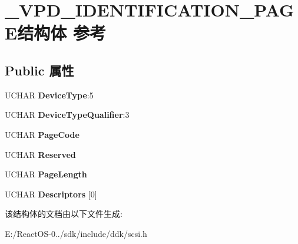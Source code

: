 \hypertarget{struct___v_p_d___i_d_e_n_t_i_f_i_c_a_t_i_o_n___p_a_g_e}{}\section{\+\_\+\+V\+P\+D\+\_\+\+I\+D\+E\+N\+T\+I\+F\+I\+C\+A\+T\+I\+O\+N\+\_\+\+P\+A\+G\+E结构体 参考}
\label{struct___v_p_d___i_d_e_n_t_i_f_i_c_a_t_i_o_n___p_a_g_e}
\subsection*{Public 属性}
\begin{DoxyCompactItemize}
\item 
\mbox{\label{struct___v_p_d___i_d_e_n_t_i_f_i_c_a_t_i_o_n___p_a_g_e_a60b5c727b277ca2745e774e525c1b9e5}} 
U\+C\+H\+AR {\bfseries Device\+Type}\+:5
\item 
\mbox{\label{struct___v_p_d___i_d_e_n_t_i_f_i_c_a_t_i_o_n___p_a_g_e_a0a17f25a55496112133aec311dedb99d}} 
U\+C\+H\+AR {\bfseries Device\+Type\+Qualifier}\+:3
\item 
\mbox{\label{struct___v_p_d___i_d_e_n_t_i_f_i_c_a_t_i_o_n___p_a_g_e_a2163d79276aefd85a2f5fa0c6a0a6c89}} 
U\+C\+H\+AR {\bfseries Page\+Code}
\item 
\mbox{\label{struct___v_p_d___i_d_e_n_t_i_f_i_c_a_t_i_o_n___p_a_g_e_a8c7693491f2ed78aa00aac75d1709fe2}} 
U\+C\+H\+AR {\bfseries Reserved}
\item 
\mbox{\label{struct___v_p_d___i_d_e_n_t_i_f_i_c_a_t_i_o_n___p_a_g_e_a5625477aebba1dbe27865a6801dd51b1}} 
U\+C\+H\+AR {\bfseries Page\+Length}
\item 
\mbox{\label{struct___v_p_d___i_d_e_n_t_i_f_i_c_a_t_i_o_n___p_a_g_e_ae32552f6525f178a402da98ce01418ba}} 
U\+C\+H\+AR {\bfseries Descriptors} \mbox{[}0\mbox{]}
\end{DoxyCompactItemize}


该结构体的文档由以下文件生成\+:\begin{DoxyCompactItemize}
\item 
E\+:/\+React\+O\+S-\/0../sdk/include/ddk/scsi.\+h\end{DoxyCompactItemize}
